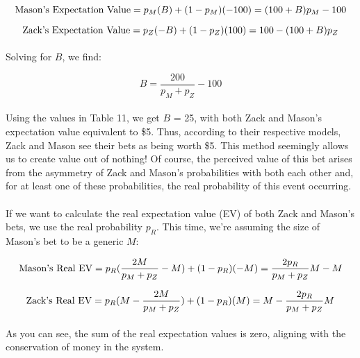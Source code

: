 \documentclass[12pt,letterpaper]{article}
\begin{document}
\begin{equation}
\textnormal{Mason's Expectation Value} = p_M (B) + (1 - p_M )(-100) = (100 + B)  p_M  - 100
\end{equation}

\begin{equation}
\textnormal{Zack's Expectation Value} = p_Z (-B) + (1 - p_Z )(100) = 100 - (100 + B)  p_Z 
\end{equation}

\paragraph{} Solving for $B$, we find:

\begin{equation}
B = \frac{200}{p_M + p_Z} - 100
\end{equation}

\paragraph{} Using the values in Table 11, we get $B$ = 25, with both Zack and Mason’s expectation value equivalent to \$5. Thus, according to their respective models, Zack and Mason see their bets as being worth \$5. This method seemingly allows us to create value out of nothing! Of course, the perceived value of this bet arises from the asymmetry of Zack and Mason’s probabilities with both each other and, for at least one of these probabilities, the real probability of this event occurring.

\paragraph{} If we want to calculate the real expectation value (EV) of both Zack and Mason’s bets, we use the real probability $p_R$. This time, we’re assuming the size of Mason’s bet to be a generic $M$:

\begin{equation}
\textnormal{Mason's Real EV} = p_R(\frac{2 M}{p_M  +  p_Z}  - M) + (1 - p_R )(-M) = \frac{2 p_R}{p_M  +  p_Z}  M - M
\end{equation}

\begin{equation}
\textnormal{Zack's Real EV} = p_R(M - \frac{2 M}{p_M  +  p_Z}) + (1 - p_R )(M) = M - \frac{2 p_R}{p_M  +  p_Z}  M
\end{equation}

\paragraph{} As you can see, the sum of the real expectation values is zero, aligning with the conservation of money in the system. 
\end{document}
